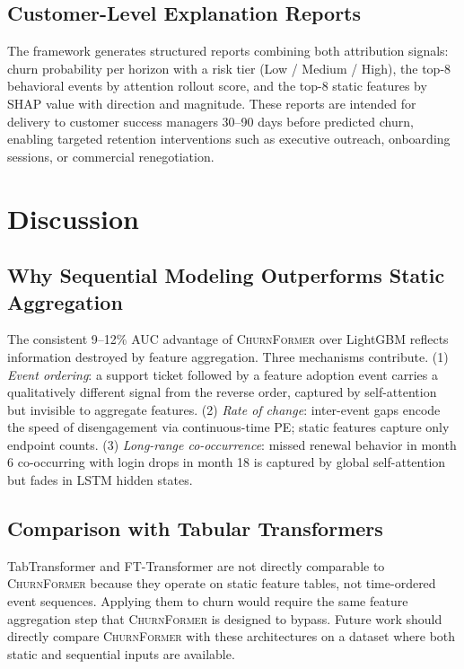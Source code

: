\documentclass[review, 12pt]{elsarticle}
\newcommand{\model}{\textsc{ChurnFormer}}
\begin{document}
\subsection{Customer-Level Explanation Reports}

The framework generates structured reports combining both attribution signals:
churn probability per horizon with a risk tier (Low / Medium / High), the
top-8 behavioral events by attention rollout score, and the top-8 static
features by SHAP value with direction and magnitude.
These reports are intended for delivery to customer success managers 30--90
days before predicted churn, enabling targeted retention interventions such
as executive outreach, onboarding sessions, or commercial renegotiation.

\section{Discussion}
\label{sec:discussion}

\subsection{Why Sequential Modeling Outperforms Static Aggregation}

The consistent 9--12\% AUC advantage of \model{} over LightGBM reflects
information destroyed by feature aggregation.
Three mechanisms contribute.
(1) \emph{Event ordering}: a support ticket followed by a feature adoption
event carries a qualitatively different signal from the reverse order,
captured by self-attention but invisible to aggregate features.
(2) \emph{Rate of change}: inter-event gaps encode the speed of disengagement
via continuous-time PE; static features capture only endpoint counts.
(3) \emph{Long-range co-occurrence}: missed renewal behavior in month 6
co-occurring with login drops in month 18 is captured by global self-attention
but fades in LSTM hidden states.

\subsection{Comparison with Tabular Transformers}

TabTransformer \cite{huang2020tabtransformer} and FT-Transformer
\cite{gorishniy2021} are not directly comparable to \model{} because they
operate on static feature tables, not time-ordered event sequences.
Applying them to churn would require the same feature aggregation step that
\model{} is designed to bypass.
Future work should directly compare \model{} with these architectures on a
dataset where both static and sequential inputs are available.
\end{document}
